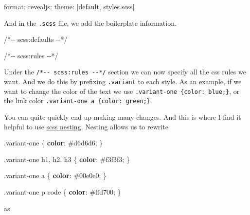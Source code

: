 \documentclass[
  letterpaper,
  DIV=11,
  numbers=noendperiod]{scrreprt}
\newenvironment{Shaded}{\begin{snugshade}}{\end{snugshade}}
\newcommand{\AnnotationTok}[1]{\textcolor[rgb]{0.37,0.37,0.37}{#1}}
\newcommand{\CharTok}[1]{\textcolor[rgb]{0.13,0.47,0.30}{#1}}
\newcommand{\CommentTok}[1]{\textcolor[rgb]{0.37,0.37,0.37}{#1}}
\newcommand{\ConstantTok}[1]{\textcolor[rgb]{0.56,0.35,0.01}{#1}}
\newcommand{\FunctionTok}[1]{\textcolor[rgb]{0.28,0.35,0.67}{#1}}
\newcommand{\KeywordTok}[1]{\textcolor[rgb]{0.00,0.23,0.31}{\textbf{#1}}}
\newcommand{\NormalTok}[1]{\textcolor[rgb]{0.00,0.23,0.31}{#1}}
\newcommand{\OperatorTok}[1]{\textcolor[rgb]{0.37,0.37,0.37}{#1}}
\newcommand{\OtherTok}[1]{\textcolor[rgb]{0.00,0.23,0.31}{#1}}
\begin{document}
\begin{Shaded}
\begin{Highlighting}[]
\AnnotationTok{format:}
\NormalTok{  revealjs:}
\NormalTok{    theme: }\CommentTok{[}\OtherTok{default, styles.scss}\CommentTok{]}
\end{Highlighting}
\end{Shaded}

And in the \texttt{.scss} file, we add the boilerplate information.

\begin{Shaded}
\begin{Highlighting}[]
\CommentTok{/*{-}{-} scss:defaults {-}{-}*/}

\CommentTok{/*{-}{-} scss:rules {-}{-}*/}
\end{Highlighting}
\end{Shaded}

Under the \texttt{/*-\/-\ scss:rules\ -\/-*/} section we can now specify
all the css rules we want. And we do this by prefixing \texttt{.variant}
to each style. As an example, if we want to change the color of the text
we use \texttt{.variant-one\ \{color:\ blue;\}}, or the link color
\texttt{.variant-one\ a\ \{color:\ green;\}}.

You can quite quickly end up making many changes. And this is where I
find it helpful to use
\href{https://sass-lang.com/documentation/style-rules\#nesting}{scss
nesting}. Nesting allows us to rewrite

\begin{Shaded}
\begin{Highlighting}[]

\FunctionTok{.variant{-}one}\NormalTok{ \{}
  \KeywordTok{color}\CharTok{:} \ConstantTok{\#d6d6d6}\OperatorTok{;}
\NormalTok{\}}

\FunctionTok{.variant{-}one}\NormalTok{ h1}\OperatorTok{,}\NormalTok{ h2}\OperatorTok{,}\NormalTok{ h3 \{}
  \KeywordTok{color}\CharTok{:} \ConstantTok{\#f3f3f3}\OperatorTok{;}
\NormalTok{\}}

\FunctionTok{.variant{-}one}\NormalTok{ a \{}
  \KeywordTok{color}\CharTok{:} \ConstantTok{\#00e0e0}\OperatorTok{;}
\NormalTok{\}}

\FunctionTok{.variant{-}one}\NormalTok{ p code \{}
  \KeywordTok{color}\CharTok{:} \ConstantTok{\#ffd700}\OperatorTok{;}
\NormalTok{\}}
\end{Highlighting}
\end{Shaded}

as
\end{document}
